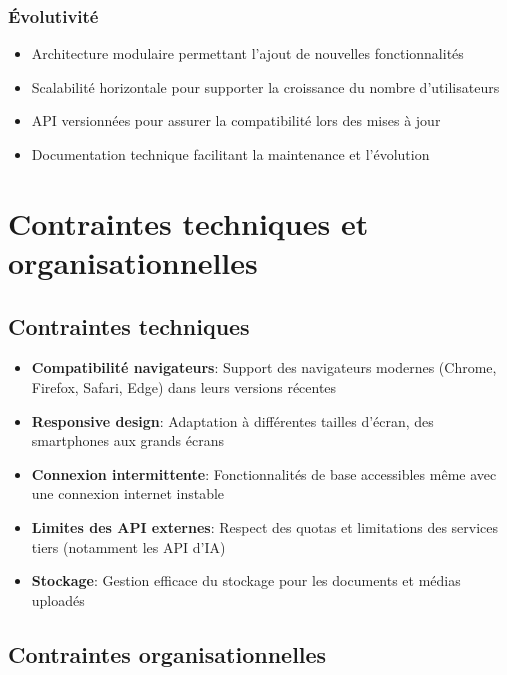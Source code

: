 \subsubsection{Évolutivité}

\begin{itemize}
  \item Architecture modulaire permettant l'ajout de nouvelles fonctionnalités
  \item Scalabilité horizontale pour supporter la croissance du nombre d'utilisateurs
  \item API versionnées pour assurer la compatibilité lors des mises à jour
  \item Documentation technique facilitant la maintenance et l'évolution
\end{itemize}

\section{Contraintes techniques et organisationnelles}

\subsection{Contraintes techniques}

\begin{itemize}
  \item \textbf{Compatibilité navigateurs}: Support des navigateurs modernes (Chrome, Firefox, Safari, Edge) dans leurs versions récentes
  
  \item \textbf{Responsive design}: Adaptation à différentes tailles d'écran, des smartphones aux grands écrans
  
  \item \textbf{Connexion intermittente}: Fonctionnalités de base accessibles même avec une connexion internet instable
  
  \item \textbf{Limites des API externes}: Respect des quotas et limitations des services tiers (notamment les API d'IA)
  
  \item \textbf{Stockage}: Gestion efficace du stockage pour les documents et médias uploadés
\end{itemize}

\subsection{Contraintes organisationnelles}

